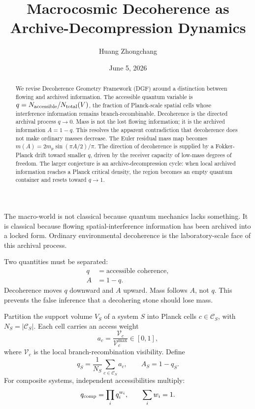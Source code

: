 \documentclass[aps,prl,twocolumn,superscriptaddress,nofootinbib,floatfix]{revtex4-2}
\begin{document}
\title{Macrocosmic Decoherence as Archive-Decompression Dynamics}
\author{Huang Zhongchang}
\date{June 5, 2026}
\begin{abstract}
We revise Decoherence Geometry Framework (DGF) around a distinction between flowing and archived information. The accessible quantum variable is $q=N_{\rm accessible}/N_{\rm total}(V)$, the fraction of Planck-scale spatial cells whose interference information remains branch-recombinable. Decoherence is the directed archival process $q\to0$. Mass is not the lost flowing information; it is the archived information $A=1-q$. This resolves the apparent contradiction that decoherence does not make ordinary masses decrease. The Euler residual mass map becomes $m(A)=2m_p\sin(\pi A/2)/\pi$. The direction of decoherence is supplied by a Fokker-Planck drift toward smaller $q$, driven by the receiver capacity of low-mass degrees of freedom. The larger conjecture is an archive-decompression cycle: when local archived information reaches a Planck critical density, the region becomes an empty quantum container and resets toward $q\to1$.
\end{abstract}
\maketitle

The macro-world is not classical because quantum mechanics lacks something. It is classical because flowing spatial-interference information has been archived into a locked form. Ordinary environmental decoherence is the laboratory-scale face of this archival process.

Two quantities must be separated:
\begin{align}
q&=\text{accessible coherence},\\
A&=1-q.
\end{align}
Decoherence moves $q$ downward and $A$ upward. Mass follows $A$, not $q$. This prevents the false inference that a decohering stone should lose mass.

Partition the support volume $V_S$ of a system $S$ into Planck cells $c\in\mathcal C_S$, with $N_S=|\mathcal C_S|$. Each cell carries an access weight
\begin{equation}
a_c=\frac{\mathcal V_c}{\mathcal V_c^{\max}}\in[0,1],
\end{equation}
where $\mathcal V_c$ is the local branch-recombination visibility. Define
\begin{equation}
\boxed{
q_S=\frac{1}{N_S}\sum_{c\in\mathcal C_S}a_c,
\qquad
A_S=1-q_S.
}
\end{equation}
For composite systems, independent accessibilities multiply:
\begin{equation}
q_{\rm comp}=\prod_iq_i^{w_i},
\qquad \sum_iw_i=1.
\end{equation}
\end{document}
